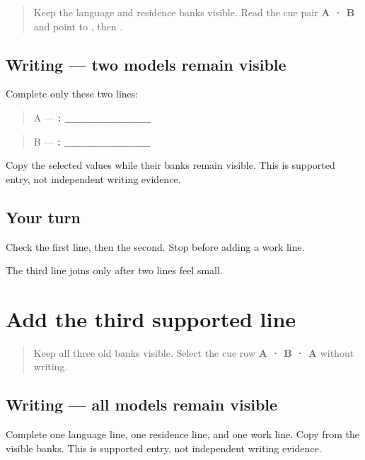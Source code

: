 \label{lesson:PA-W06-two-field-supported}



\begin{quote}
Keep the language and residence banks visible. Read the cue pair \textbf{A · B} and point to \textbf{}, then \textbf{}.
\end{quote}

\subsection*{Writing — two models remain visible}
Complete only these two lines:

\begin{quote}
A — \textbf{: \_\_\_\_\_\_\_\_\_\_}
\end{quote}

\begin{quote}
B — \textbf{: \_\_\_\_\_\_\_\_\_\_}
\end{quote}

Copy the selected values while their banks remain visible. This is supported entry, not independent writing evidence.

\subsection*{Your turn}
Check the first line, then the second. Stop before adding a work line.

\begin{tcolorbox}[breakable,colback=teal!4,colframe=teal!35!black,title={Before you move on}]
The third line joins only after two lines feel small.
\end{tcolorbox}
\section[\texorpdfstring{\pa{ਭਾਸ਼ਾ} · \pa{ਰਿਹਾਇਸ਼} · \pa{ਕੰਮ} (three supported …)}{ਭਾਸ਼ਾ · ਰਿਹਾਇਸ਼ · ਕੰਮ (three supported …)}]{Add the third supported line}

\label{lesson:PA-W06-three-field-supported}



\begin{quote}
Keep all three old banks visible. Select the cue row \textbf{A · B · A} without writing.
\end{quote}

\subsection*{Writing — all models remain visible}
Complete one language line, one residence line, and one work line. Copy from the visible banks. This is supported entry, not independent writing evidence.


